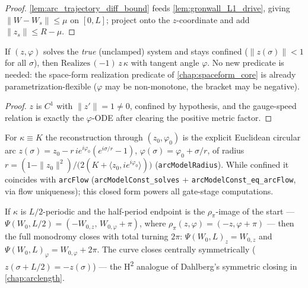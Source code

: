 \begin{proof}
  \leanok
  \cref{lem:arc_trajectory_diff_bound} feeds \cref{lem:gronwall_L1_drive},
  giving $\|W-W_s\|\le\mu$ on $[0,L]$; project onto the $z$-coordinate and add
  $\|z_s\|\le R-\mu$.
\end{proof}

\begin{lemma}\leanok
[a confined solution realizes $\kappa$ at $\varepsilon=-1$]
  \label{lem:arc_solution_realizes}
  If $(z,\varphi)$ solves the \emph{true} (unclamped) system and stays confined
  ($\|z(\sigma)\|<1$ for all $\sigma$), then
  $\mathrm{Realizes}\,(-1)\,z\,\kappa$ with tangent angle $\varphi$. No new
  predicate is needed: the space-form realization predicate of
  \cref{chap:spaceform_core} is already parametrization-flexible ($\varphi$ may
  be non-monotone, the bracket may be negative).
\end{lemma}

\begin{proof}
\leanok
  $z$ is $C^1$ with $\|z'\|=1\ne0$, confined by hypothesis, and the gauge-speed
  relation is exactly the $\varphi$-ODE after clearing the positive metric
  factor.
\end{proof}

\begin{definition}
  \label{def:arc_model_const}
  For $\kappa\equiv K$ the reconstruction through $(z_0,\varphi_0)$ is the
  explicit Euclidean circular arc
  $z(\sigma)=z_0-r\,ie^{i\varphi_0}(e^{i\sigma/r}-1)$,
  $\varphi(\sigma)=\varphi_0+\sigma/r$, of radius
  $r=(1-\|z_0\|^2)/\bigl(2(K+\langle z_0,ie^{i\varphi_0}\rangle)\bigr)$
  (\texttt{arcModelRadius}). While confined it coincides with
  \texttt{arcFlow} (\texttt{arcModelConst\_solves} +
  \texttt{arcModelConst\_eq\_arcFlow}, via flow uniqueness); this closed form
  powers all gate-stage computations.
\end{definition}

\begin{lemma}
  \label{lem:arc_closure_of_half_period_match}
  If $\kappa$ is $L/2$-periodic and the half-period endpoint is the
  $\rho_\pi$-image of the start —
  $\Psi(W_0,L/2)=(-W_{0,z},\,W_{0,\varphi}+\pi)$, where
  $\rho_\pi(z,\varphi)=(-z,\varphi+\pi)$ — then the full monodromy closes with
  total turning $2\pi$: $\Psi(W_0,L)_z=W_{0,z}$ and
  $\Psi(W_0,L)_\varphi=W_{0,\varphi}+2\pi$. The curve closes centrally
  symmetrically ($z(\sigma+L/2)=-z(\sigma)$) — the H\textsuperscript{2}
  analogue of Dahlberg's symmetric closing in \cref{chap:arclength}.
\end{lemma}

